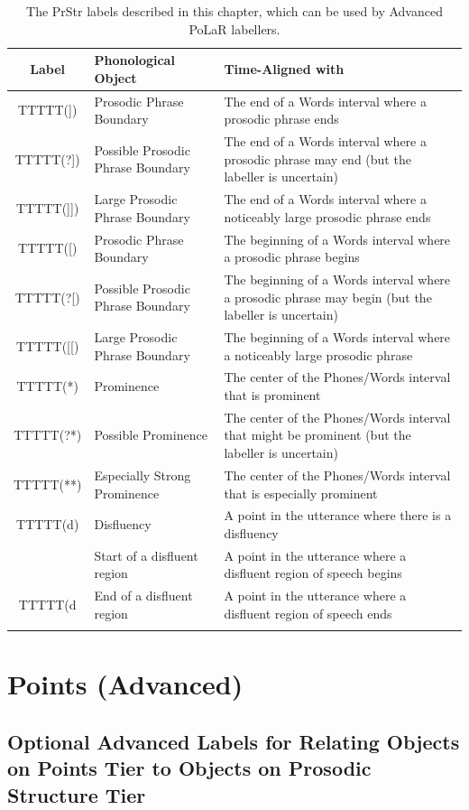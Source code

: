 \documentclass[11pt, twoside]{memoir}
\def\textlabel#1{{\relsize{-.5}\fontspec[Mapping=tex-text]{Roboto Mono}{#1}}}
\begin{document}
\begin{longtable}{cp{.3\linewidth}p{.45\linewidth}}
	\toprule
	\textbf{Label} & \textbf{Phonological Object} & \textbf{Time-Aligned with} \tabularnewline
	\midrule
	\endhead
	\rowcolor{green}
	TTTTT(]) & Prosodic Phrase Boundary & The end of a Words interval where a prosodic phrase ends \tabularnewline
	TTTTT(?]) & Possible Prosodic Phrase Boundary & The end of a Words interval where a prosodic phrase may end (but the labeller is uncertain) \tabularnewline
	TTTTT(]]) & Large Prosodic Phrase Boundary & The end of a Words interval where a noticeably large prosodic phrase ends \tabularnewline
	TTTTT([) & Prosodic Phrase Boundary & The beginning of a Words interval where a prosodic phrase begins \tabularnewline
	TTTTT(?[) & Possible Prosodic Phrase Boundary & The beginning of a Words interval where a prosodic phrase may begin (but the labeller is uncertain) \tabularnewline
	TTTTT([[) & Large Prosodic Phrase Boundary & The beginning of a Words interval where a noticeably large prosodic phrase \tabularnewline
	\hline
	\rowcolor{green}
	TTTTT(*) & Prominence & The center of the Phones/Words interval that is prominent\tabularnewline
	TTTTT(?*) & Possible Prominence & The center of the Phones/Words interval that might be prominent (but the labeller is uncertain) \tabularnewline
	TTTTT(**) & Especially Strong Prominence & The center of the Phones/Words interval that is especially prominent \tabularnewline
	\hline
	TTTTT(d) & Disfluency & A point in the utterance where there is a disfluency\tabularnewline
	\textlabel{\{d} & Start of a disfluent region & A point in the utterance where a disfluent region of speech begins\tabularnewline
	TTTTT(d\)} & End of a disfluent region & A point in the utterance where a disfluent region of speech ends\tabularnewline
	\bottomrule
	\caption{The PrStr labels described in this chapter, which can be used by Advanced PoLaR labellers.}
\end{longtable}


\section{Points (Advanced)}\label{sec:points-advanced}

\subsection{Optional Advanced Labels for Relating Objects on Points Tier to Objects on Prosodic Structure Tier}\label{sec:optional-advanced-labels-for-relating-points-tier-objects-to-prosodic-structure-tier-objects}
\end{document}
